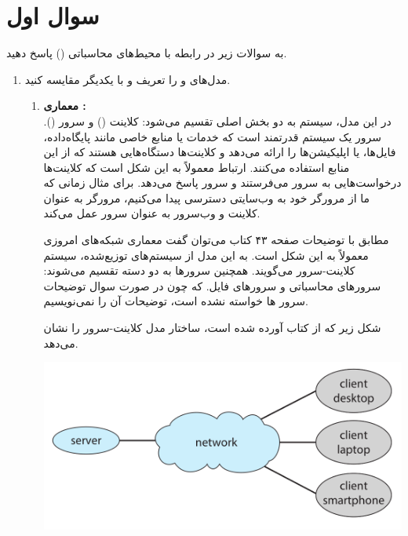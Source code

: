 \section{سوال اول}

به سوالات زیر در رابطه با محیط‌های محاسباتی () پاسخ دهید.

\begin{enumerate}
	\item 
	مدل‌های  و  را تعریف و با یکدیگر مقایسه کنید.
	
	\begin{qsolve}
		\begin{enumerate}
			\item 
			\textbf{معماری : }\\
			در این مدل، سیستم به دو بخش اصلی تقسیم می‌شود: کلاینت () و سرور ().
			سرور یک سیستم قدرتمند است که خدمات یا منابع خاصی مانند پایگاه‌داده، فایل‌ها، یا اپلیکیشن‌ها را ارائه می‌دهد و کلاینت‌ها دستگاه‌هایی هستند که از این منابع استفاده می‌کنند. ارتباط معمولاً به این شکل است که کلاینت‌ها درخواست‌هایی به سرور می‌فرستند و سرور پاسخ می‌دهد. برای مثال زمانی که ما از مرورگر خود به وب‌سایتی دسترسی پیدا می‌کنیم، مرورگر به عنوان کلاینت و وب‌سرور به عنوان سرور عمل می‌کند.
			
			مطابق با توضیحات صفحه ۴۳ کتاب  می‌توان گفت معماری شبکه‌های امروزی معمولاً به این شکل است. به این مدل از سیستم‌های توزیع‌شده، سیستم کلاینت-سرور می‌گویند. همچنین سرورها به دو دسته تقسیم می‌شوند: سرورهای محاسباتی و سرورهای فایل. که چون در صورت سوال توضیحات سرور ها خواسته نشده است، توضیحات آن را نمی‌نویسیم.
			
			شکل زیر که از کتاب  آورده شده است، ساختار مدل کلاینت-سرور را نشان می‌دهد.
			
			\begin{center}
				\includegraphics*[width=0.7\linewidth]{pics/img1.png}
			\end{center}



\end{enumerate}
\end{qsolve}
\end{enumerate}
